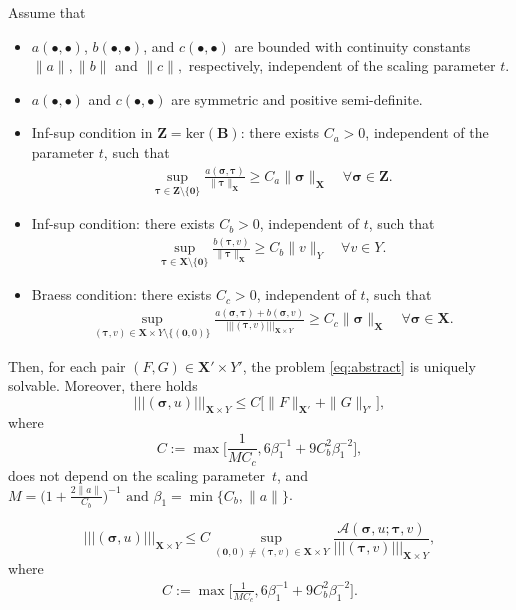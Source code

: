 \documentclass[10pt,a4paper]{amsart}
\newcommand{\bB}{\mathbf{B}}
\newcommand{\bX}{\mathbf{X}}
\newcommand{\bZ}{\mathbf{Z}}
\newcommand\bsigma{\boldsymbol{\sigma}}
\newcommand\btau{\boldsymbol{\tau}}
\newcommand\bzero{\boldsymbol{0}}
\newcommand\bzeta{\boldsymbol{\zeta}}
\newcommand*\tnorm[1]{|\!|\!| #1 |\!|\!|}
\begin{document}
\begin{theorem}\label{th:abstract}
 Assume that  
\begin{itemize}
\item $a(\bullet,\bullet)$, $b(\bullet,\bullet)$, and $c(\bullet,\bullet)$  are bounded with {continuity constants} \(\|a\|, \|b\|\) and \(\|c\|,\) respectively, independent of the scaling parameter $t$. 
    \item $a(\bullet,\bullet)$ and $c(\bullet,\bullet)$ are symmetric and positive semi-definite.
    \item Inf-sup condition in $\bZ = \mathrm{ker}(\bB)$: there exists $C_a>0$, independent of the parameter $t$, such that 
    \begin{align}\label{eq:inf-sup.a} \sup_{\btau \in \bZ\setminus\{\boldsymbol{0}\}} \frac{a(\bsigma,\btau)}{\|\btau\|_{\bX}} \geq C_a \| \bsigma\|_{\bX} \quad \forall \bsigma \in \bZ.\end{align}
    \item Inf-sup condition: there exists $C_b>0$, independent of $t$, such that 
    \begin{align}\label{eq:inf-sup.b} \sup_{\btau \in \bX\setminus\{\boldsymbol{0}\}} \frac{b(\btau,v)}{\|\btau\|_{\bX}} \geq C_b \| v\|_Y \quad \forall v \in Y.\end{align}    
    \item Braess condition: there exists $C_c>0$, independent of $t$, such that 
    \begin{align}\label{eq:Braess}\sup_{(\btau,v) \in \bX\times Y \setminus\{(\boldsymbol{0},0)\}} \frac{a(\bsigma,\btau)+b(\bsigma,v)}{\tnorm{(\btau,v)}_{\bX\times Y}} \geq C_c \| \bsigma \|_{\bX} \quad \forall \bsigma \in \bX.\end{align} 
\end{itemize}
Then, for each pair $(F,G) \in \bX'\times Y'$, the problem \eqref{eq:abstract} is uniquely solvable. Moreover, there holds 
\[\tnorm{(\bsigma,u)}_{\bX\times Y} \leq C\bigl[ \|F\|_{\bX'} + \|G\|_{Y'}\bigr], \]
where \[C:=\max\bigl[\frac{1}{MC_c},6\beta_1^{-1}+9C_b^2\beta_1^{-2}\bigr],\]  
 does not depend on the scaling parameter \(\,t\), and \(M={\bigl({1+\frac{2\|a\|}{C_b}}\bigr)^{-1}} \text{ and } \beta_1=\min\{{C_b,\|a\|}\}\). 
\end{theorem}

\[\tnorm{(\bsigma,u)}_{\bX\times Y}\leq C  \sup_{(\bzero,0)\neq(\btau,v)\in{\bX\times Y}}\frac{\mathcal{A}(\bsigma,u;\btau,v)}{\tnorm{(\btau,v)}_{\bX\times Y}},\] where \begin{align}\label{eq:C}C:=\max\bigl[\frac{1}{MC_c},6\beta_1^{-1}+9C_b^2\beta_1^{-2}\bigr].\end{align}
\end{document}

